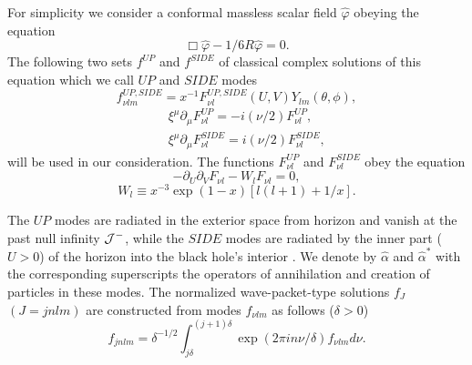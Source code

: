 \documentclass[superscriptaddress,showpacs,preprintnumbers,amsmath,amssymb,
nofootinbib,twocolumn,aps,prd,10pt]{revtex4-1}
\begin{document}
For simplicity we consider  a conformal massless scalar field
$\hat{\varphi}$ obeying the equation
\begin{equation}
\Box \hat{\varphi} -1/6 R\hat{\varphi}
=0. \label{9}
\end{equation}
The following two sets $f^{UP}$ and $f^{SIDE}$ of classical complex
solutions of this equation which we call  $UP$ and $SIDE$ modes
\begin{equation}
f^{UP,SIDE}_{\nu lm}=x^{-1}F^{UP,SIDE}_{\nu
l}(U,V)Y_{lm}(\theta ,\phi ), \label{10}
\end{equation}
\begin{eqnarray}
&&\xi ^{\mu}\partial _{\mu}F^{UP}_{\nu l}=-i(\nu /2) F^{UP}_{\nu l},\nonumber\\
&& \xi ^{\mu}\partial _{\mu}F^{SIDE}_{\nu l}=i(\nu /2)
F^{SIDE}_{\nu l}, \nonumber
\end{eqnarray}
will be used in our consideration. The functions
$F^{UP}_{\nu l}$ and $F^{SIDE}_{\nu l}$ obey the equation
\begin{equation}
-\partial _U \partial _V F_{\nu l} -W_l F_{\nu l} =0, \label{11}
\end{equation}
\begin{equation}
W_l \equiv x^{-3} \exp (1-x) [l(l+1)+1/x]. \label{12}
\end{equation}

The $UP$ modes are radiated  in the exterior space  from
horizon  and vanish at the past null infinity $\cal{J}^-$,
while
the $SIDE$  modes are  radiated by the inner part ($U>0$) of
the horizon  into the black hole's
interior \cite{note2}.
We  denote  by  $\hat{\alpha}$  and  $\hat{\alpha}^*$
with  the corresponding superscripts the operators of annihilation and
creation of  particles  in  these   modes.   The  normalized
wave-packet-type solutions $f_J$ $(J=jnlm)$ are constructed from modes
$f_{\nu lm}$  as follows ($\delta >0$)
\begin{equation}
f_{jnlm}=\delta ^{-1/2}\int ^{(j+1)\delta}_{j\delta}
\exp (2\pi in\nu /\delta )f_{\nu lm}d\nu .\label{13}
\end{equation}
\end{document}
